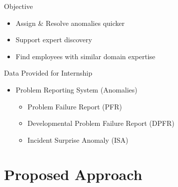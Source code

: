 \documentclass[10pt]{beamer}
\begin{document}
\begin{frame}{Objective}
  \begin{itemize}
  \item Assign \& Resolve anomalies quicker
  \item Support expert discovery
  \item Find employees with similar domain expertise
  \end{itemize}
\end{frame}


\begin{frame}{Data Provided for Internship}
  \begin{itemize}
  \item Problem Reporting System (Anomalies)
    \begin{itemize}
    \item Problem Failure Report (PFR)
    \item Developmental Problem Failure Report (DPFR)
    \item Incident Surprise Anomaly (ISA)
    \end{itemize}
  \end{itemize}

\end{frame}



\section{Proposed Approach}
\end{document}
